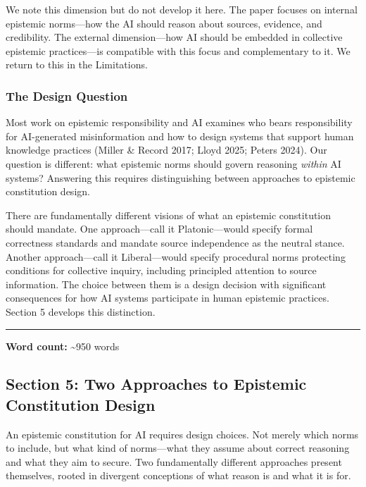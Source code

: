 We note this dimension but do not develop it here. The paper focuses on
internal epistemic norms---how the AI should reason about sources,
evidence, and credibility. The external dimension---how AI should be
embedded in collective epistemic practices---is compatible with this
focus and complementary to it. We return to this in the Limitations.

\subsubsection{The Design Question}\label{the-design-question}

Most work on epistemic responsibility and AI examines who bears
responsibility for AI-generated misinformation and how to design systems
that support human knowledge practices (Miller \& Record 2017; Lloyd
2025; Peters 2024). Our question is different: what epistemic norms
should govern reasoning \emph{within} AI systems? Answering this
requires distinguishing between approaches to epistemic constitution
design.

There are fundamentally different visions of what an epistemic
constitution should mandate. One approach---call it Platonic---would
specify formal correctness standards and mandate source independence as
the neutral stance. Another approach---call it Liberal---would specify
procedural norms protecting conditions for collective inquiry, including
principled attention to source information. The choice between them is a
design decision with significant consequences for how AI systems
participate in human epistemic practices. Section 5 develops this
distinction.

\begin{center}\rule{0.5\linewidth}{0.5pt}\end{center}

\textbf{Word count:} \textasciitilde950 words

\subsection{Section 5: Two Approaches to Epistemic Constitution
Design}\label{section-5-two-approaches-to-epistemic-constitution-design}

An epistemic constitution for AI requires design choices. Not merely
which norms to include, but what kind of norms---what they assume about
correct reasoning and what they aim to secure. Two fundamentally
different approaches present themselves, rooted in divergent conceptions
of what reason is and what it is for.

